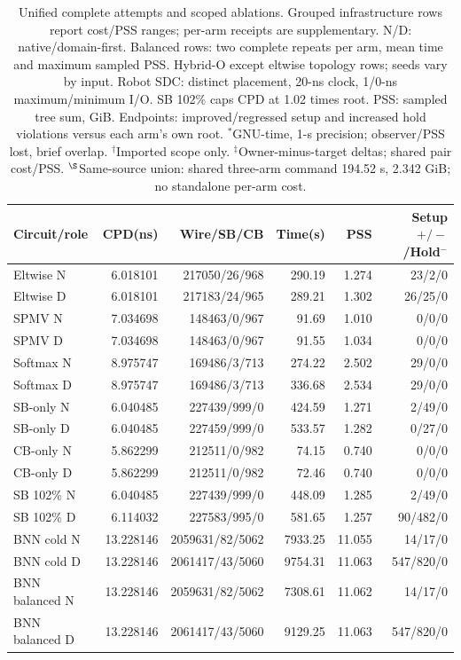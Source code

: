 \documentclass[conference,10pt]{IEEEtran}
\begin{document}
\begin{table}[t]
\centering\footnotesize\setlength{\tabcolsep}{3 pt}
\caption{Unified complete attempts and scoped ablations. Grouped infrastructure rows report cost/PSS ranges; per-arm receipts are supplementary. N/D: native/domain-first. Balanced rows: two complete repeats per arm, mean time and maximum sampled PSS. Hybrid-O except eltwise topology rows; seeds vary by input. Robot SDC: distinct placement, 20-ns clock, 1/0-ns maximum/minimum I/O. SB 102\% caps CPD at 1.02 times root. PSS: sampled tree sum, GiB. Endpoints: improved/regressed setup and increased hold violations versus each arm's own root. $^{*}$GNU-time, 1-s precision; observer/PSS lost, brief overlap. $^{\dagger}$Imported scope only. $^{\ddagger}$Owner-minus-target deltas; shared pair cost/PSS. $^{\S}$Same-source union: shared three-arm command 194.52 s, 2.342 GiB; no standalone per-arm cost.}
\label{tab:completecost}
\begin{tabular}{lrrrrr}\hline
Circuit/role & CPD(ns) & Wire/SB/CB & Time(s) & PSS & Setup $+/-$/Hold$^-$\\\hline
Eltwise N&6.018101&217050/26/968&290.19&1.274&23/2/0\\
Eltwise D&6.018101&217183/24/965&289.21&1.302&26/25/0\\
SPMV N&7.034698&148463/0/967&91.69&1.010&0/0/0\\
SPMV D&7.034698&148463/0/967&91.55&1.034&0/0/0\\
Softmax N&8.975747&169486/3/713&274.22&2.502&29/0/0\\
Softmax D&8.975747&169486/3/713&336.68&2.534&29/0/0\\
SB-only N&6.040485&227439/999/0&424.59&1.271&2/49/0\\
SB-only D&6.040485&227459/999/0&533.57&1.282&0/27/0\\
CB-only N&5.862299&212511/0/982&74.15&0.740&0/0/0\\
CB-only D&5.862299&212511/0/982&72.46&0.740&0/0/0\\
SB 102\% N&6.040485&227439/999/0&448.09&1.285&2/49/0\\
SB 102\% D&6.114032&227583/995/0&581.65&1.257&90/482/0\\
BNN cold N&13.228146&2059631/82/5062&7933.25&11.055&14/17/0\\
BNN cold D&13.228146&2061417/43/5060&9754.31&11.063&547/820/0\\
BNN balanced N&13.228146&2059631/82/5062&7308.61&11.062&14/17/0\\
BNN balanced D&13.228146&2061417/43/5060&9129.25&11.063&547/820/0\\

\end{tabular}
\end{table}
\end{document}
